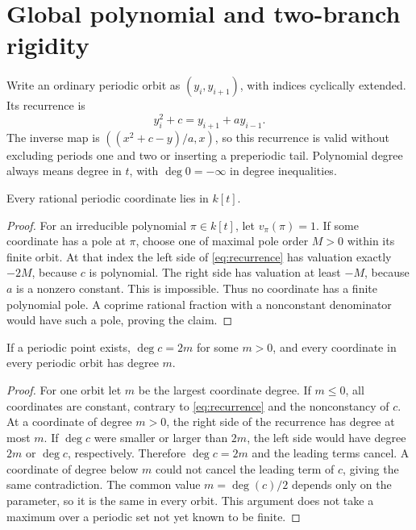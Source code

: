 \section{Global polynomial and two-branch rigidity}\label{sec:rigidity}
Write an ordinary periodic orbit as $(y_i,y_{i+1})$, with indices
cyclically extended. Its recurrence is
\begin{equation}\label{eq:recurrence}
 y_i^2+c=y_{i+1}+a y_{i-1}.
\end{equation}
The inverse map is $((x^2+c-y)/a,x)$, so this recurrence is valid
without excluding periods one and two or inserting a preperiodic tail.
Polynomial degree always means degree in $t$, with $\deg0=-\infty$
in degree inequalities.

\begin{lemma}\label{lem:integrality}
Every rational periodic coordinate lies in $k[t]$.
\end{lemma}
\begin{proof}
For an irreducible polynomial $\pi\in k[t]$, let $v_\pi(\pi)=1$.
If some coordinate has a pole at $\pi$, choose one of maximal pole
order $M>0$ within its finite orbit. At that index the left side of
\eqref{eq:recurrence} has valuation exactly $-2M$, because $c$ is
polynomial. The right side has valuation at least $-M$, because
$a$ is a nonzero constant. This is impossible. Thus no coordinate
has a finite polynomial pole. A coprime rational fraction with a
nonconstant denominator would have such a pole, proving the claim.
\end{proof}

\begin{lemma}\label{lem:degree}
If a periodic point exists, $\deg c=2m$ for some $m>0$, and every
coordinate in every periodic orbit has degree $m$.
\end{lemma}
\begin{proof}
For one orbit let $m$ be the largest coordinate degree. If $m\le0$,
all coordinates are constant, contrary to \eqref{eq:recurrence}
and the nonconstancy of $c$. At a coordinate of degree $m>0$, the
right side of the recurrence has degree at most $m$. If $\deg c$
were smaller or larger than $2m$, the left side would have degree
$2m$ or $\deg c$, respectively. Therefore $\deg c=2m$ and the
leading terms cancel. A coordinate of degree below $m$ could not
cancel the leading term of $c$, giving the same contradiction.
The common value $m=\deg(c)/2$ depends only on the parameter,
so it is the same in every orbit. This argument does not take a
maximum over a periodic set not yet known to be finite.
\end{proof}

